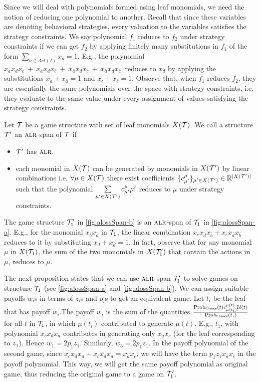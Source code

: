 Since we will deal with polynomials formed using leaf monomials, we
need the notion of reducing one polynomial to
another.   Recall that since these variables are denoting
behavioral strategies, every valuation to the variables satisfies the
strategy constraints.  We say polynomial $f_1$ reduces to $f_2$ under
strategy constraints if we can get $f_2$ by applying finitely many
substitutions in $f_1$ of the form $\sum\limits_{a \in Act(I)}
x_{a} = 1$. E.g., the polynomial
$x_a x_d x_c ~+~ x_a x_d x_{\bar{c}} ~+~x_{\bar{a}}x_d x_c ~+~ x_{\bar{a}}
x_d x_{\bar{c}}~$ reduces to $x_d$ by applying the substitutions
$x_a + x_{\bar{a}} =1$ and $x_c + x_{\bar{c}} =1$. Observe that, when
$f_1$ reduces $f_2$, they are essentially the same polynomials over
the space with strategy constraints, i.e. they evaluate to the same
value under every assignment of values satisfying the strategy
constraints.   \begin{definition}
  Let $\mathcal{T}$ be a game structure with set of leaf monomials
  $X(\mathcal{T})$. We call a structure $\mathcal{T}'$ an $\textsc{alr}$-span of $\mathcal{T}$ if
  \begin{itemize}  \item $\mathcal{T}'$ has $\textsc{alr}$.
  \item each monomial in $X(\mathcal{T})$ can be generated by monomials in
    $X(\mathcal{T}')$ by linear combinations i.e.  $\forall \mu \in X(\mathcal{T})$
    there exist coefficients
    $ \{c^{\mu}_{\mu'}\}_{\mu' \in X(\mathcal{T}')} \in \mathbb{R}^{|X(\mathcal{T}')|}$ such that the
    polynomial $\sum\limits_{\mu' \in X(\mathcal{T}')}c^{\mu}_{\mu'}\mu'$ reduces to
    $\mu$ under strategy constraints.
  \end{itemize}

\end{definition}
The game structure $\mathcal{T}'_1$ in \cref{fig:alossSpan-b} is an
$\textsc{alr}$-span of $\mathcal{T}_1$ in \cref{fig:alossSpan-a}. E.g., for the
monomial $x_{\bar{b}}x_{\bar{d}}$ in $\mathcal{T}_1$, the linear combination
$x_cx_{\bar{d}} x_{\bar{b}} + x_{\bar{c}} x_{\bar{d}} x_{\bar{b}}$
reduces to it by substituting $x_d + x_{\bar{d}} = 1$. In fact,
observe that for any monomial $\mu$ in $X(\mathcal{T}_1)$, the sum of the two
monomials in $X(\mathcal{T}'_1)$ that contain the actions in $\mu$, reduces to
$\mu$.

The next proposition states that we can use $\textsc{alr}$-span $\mathcal{T}_1'$ to solve
games on structure $\mathcal{T}_1$ (see \cref{fig:alossSpan-a} and
\cref{fig:alossSpan-b}). We can assign suitable payoffs $w_i$s in
terms of $z_i$s and $p_i$s
to get an equivalent game. Let $t_i$ be the
leaf that has payoff $w_i$.The payoff $w_i$ is the sum of the quantities
$\frac{\mathrm{Prob}_{\mathsf{Chance}}(t)c^{\mu(t)}_{\mu(t_i)}\mathcal{U}(t)}{\mathrm{Prob}_{\mathsf{Chance}}(t_i)}$ for all $t$ in
$\mathcal{T}_1$, in which $\mu(t_i)$ contributed to generate $\mu(t)$. E.g., $t_1$, with polynomial $x_c x_d x_a$ contributes in generating
only $x_ax_c$ (for the leaf corresponding to $z_1$). Hence $w_1 =
2p_1z_1$. Similarly, $w_5 = 2p_1z_1$. In the payoff polynomial of the second game, since $x_cx_dx_a + x_c\bar{x_d}x_a = x_ax_c$, we will have the term $p_1z_1 x_ax_c$ in the payoff polynomial. This way, we will get the same payoff polynomial as original game, thus reducing the original game to a game on $\mathcal{T}'_1$. 

